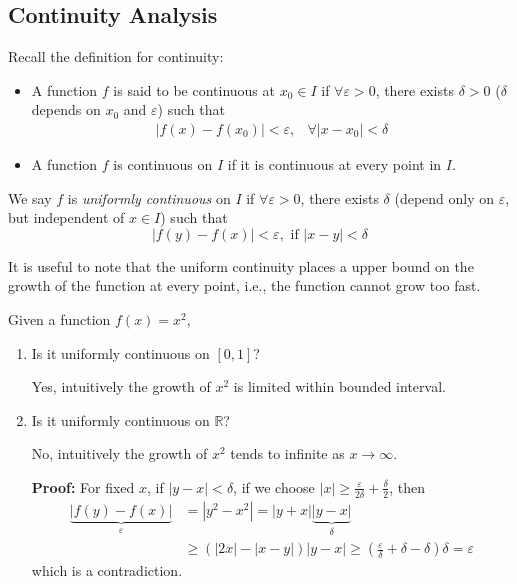 \subsection{Continuity Analysis}
Recall the definition for continuity:
\begin{itemize}
\item
A function $f$ is said to be continuous at $x_0\in I$ if $\forall\varepsilon>0$, there exists $\delta>0$ ($\delta$ depends on $x_0$ and $\varepsilon$) such that
\[
\begin{array}{ll}
|f(x) - f(x_0)|<\varepsilon,
&
\forall|x-x_0|<\delta
\end{array}
\]
\item
A function $f$ is continuous on $I$ if it is continuous at every point in $I$.
\end{itemize}
\begin{definition}[Uniform]
We say $f$ is \emph{uniformly continuous} on $I$ if $\forall\varepsilon>0$, there exists $\delta$ (depend only on $\varepsilon$, but independent of $x\in I$) such that
\[
|f(y)-f(x)|<\varepsilon,\mbox{ if }|x-y|<\delta
\]
\end{definition}
\begin{remark}
It is useful to note that the uniform continuity places a upper bound on the growth of the function at every point, i.e., the function cannot grow too fast.
\end{remark}
\begin{example}
Given a function $f(x)=x^2$,
\begin{enumerate}
\item
Is it uniformly continuous on $[0,1]$?

Yes, intuitively the growth of $x^2$ is limited within bounded interval.
\item
Is it uniformly continuous on $\mathbb{R}$?

No, intuitively the growth of $x^2$ tends to infinite as $x\to\infty$.

\textbf{Proof:} For fixed $x$, if $|y-x|<\delta$, if we choose $|x|\ge\frac{\varepsilon}{2\delta}+\frac{\delta}{2}$, then
\begin{align*}
\underbrace{|f(y) - f(x)|}_{\varepsilon} &= |y^2 - x^2| = |y+x|\underbrace{|y - x|}_{\delta}\\
&\ge (|2x| - |x-y|)|y - x|\ge(\frac{\varepsilon}{\delta}+\delta-\delta)\delta=\varepsilon
\end{align*}
which is a contradiction.
\end{enumerate}
\end{example}
